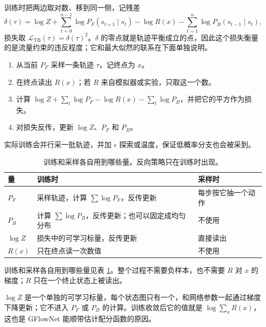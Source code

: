 训练时把两边取对数、移到同一侧，记残差
\begin{equation}
 \delta(\tau)=\log Z+\sum_{t=0}^{n-1}\log P_F(s_{t+1}\mid s_t)-\log R(x)-\sum_{t=1}^{n}\log P_B(s_{t-1}\mid s_t),
 \label{eq:gfn-residual}
\end{equation}
损失取 \(\mathcal L_{\mathrm{TB}}(\tau)=\delta(\tau)^2\)。\(\delta\) 的零点就是轨迹平衡成立的点，因此这个损失衡量的是流量约束的违反程度；它和最大似然的联系在下面单独说明。

\begin{examplebox}[一次训练更新]
\begin{enumerate}
  \item 从当前 \(P_F\) 采样一条轨迹 \(\tau\)，记终点为 \(x\)。
  \item 在终点读出 \(R(x)\)；若 \(R\) 来自模拟器或实验，只取这一个数。
  \item 计算 \(\log Z+\sum_t\log P_F-\log R(x)-\sum_t\log P_B\)，并把它的平方作为损失。
  \item 对损失反传，更新 \(\log Z\)、\(P_F\) 和 \(P_B\)。
\end{enumerate}
实际训练会并行采一批轨迹，并加 \(\epsilon\) 探索或温度，保证低概率分支也会被采到。
\end{examplebox}

\begin{table}[H]
\centering\small
\begin{tabularx}{\textwidth}{>{\bfseries}p{18mm} X X}
\toprule
量 & 训练时 & 采样时\\
\midrule
\(P_F\) & 采样轨迹，计算 \(\sum\log P_F\)，反传更新 & 每步按它抽一个动作\\
\(P_B\) & 计算 \(\sum\log P_B\)，反传更新；也可以固定成均匀分布 & 不使用\\
\(\log Z\) & 损失中的可学习标量，反传更新 & 直接读出\\
\(R(x)\) & 只在终点读一次数值 & 不使用\\
\bottomrule
\end{tabularx}
\caption{训练和采样各自用到哪些量。反向策略只在训练时出现。}
\label{tab:gfn-train-sample}
\end{table}

训练和采样各自用到哪些量见表 \ref{tab:gfn-train-sample}。整个过程不需要负样本，也不需要 \(R\) 对 \(x\) 的梯度；\(R\) 只在一个终止状态上被读出。

\(\log Z\) 是一个单独的可学习标量，每个状态图只有一个，和网络参数一起通过梯度下降更新；它不进入 \(P_F\) 或 \(P_B\) 的计算。训练收敛后它的值就是 \(\log\sum_xR(x)\)，这也是 GFlowNet 能顺带估计配分函数的原因。

